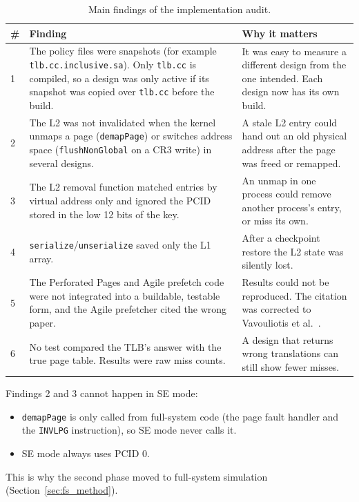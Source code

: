 \begin{table}[htbp]
\centering
\small
\caption{Main findings of the implementation audit.}
\label{tab:audit}
\begin{tabularx}{\textwidth}{l X X}
\toprule
\textbf{\#} & \textbf{Finding} & \textbf{Why it matters} \\
\midrule
1 & The policy files were snapshots (for example \texttt{tlb.cc.inclusive.sa}). Only \texttt{tlb.cc} is compiled, so a design was only active if its snapshot was copied over \texttt{tlb.cc} before the build. & It was easy to measure a different design from the one intended. Each design now has its own build. \\
2 & The L2 was not invalidated when the kernel unmaps a page (\texttt{demapPage}) or switches address space (\texttt{flushNonGlobal} on a CR3 write) in several designs. & A stale L2 entry could hand out an old physical address after the page was freed or remapped. \\
3 & The L2 removal function matched entries by virtual address only and ignored the PCID stored in the low 12 bits of the key. & An unmap in one process could remove another process's entry, or miss its own. \\
4 & \texttt{serialize}/\texttt{unserialize} saved only the L1 array. & After a checkpoint restore the L2 state was silently lost. \\
5 & The Perforated Pages and Agile prefetch code were not integrated into a buildable, testable form, and the Agile prefetcher cited the wrong paper. & Results could not be reproduced. The citation was corrected to Vavouliotis et al.~\cite{vavouliotis2021agile}. \\
6 & No test compared the TLB's answer with the true page table. Results were raw miss counts. & A design that returns wrong translations can still show fewer misses. \\
\bottomrule
\end{tabularx}
\end{table}

Findings 2 and 3 cannot happen in SE mode:
\begin{itemize}
    \item \texttt{demapPage} is only called from full-system code (the page fault handler and the \texttt{INVLPG} instruction), so SE mode never calls it.
    \item SE mode always uses PCID 0.
\end{itemize}
This is why the second phase moved to full-system simulation (Section~\ref{sec:fs_method}).

